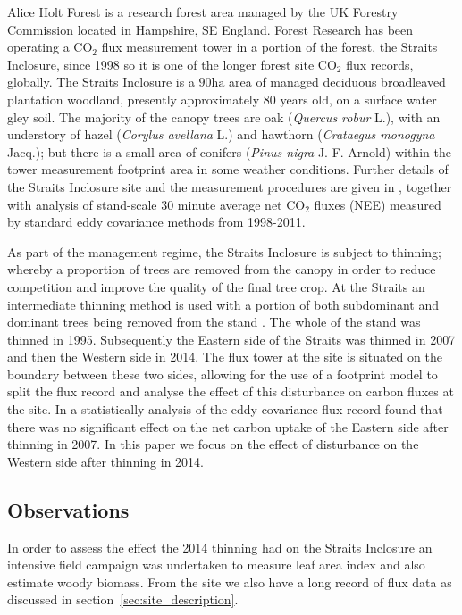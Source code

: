 \documentclass[11pt]{article}
\begin{document}
Alice Holt Forest is a research forest area managed by the UK Forestry Commission located in Hampshire, SE England. Forest Research has been operating a $\text{CO}_{2}$ flux measurement tower in a portion of the forest, the Straits Inclosure, since 1998 so it is one of the longer forest site $\text{CO}_2$ flux records, globally. The Straits Inclosure is a $90 \text{ha}$ area of managed deciduous broadleaved plantation woodland, presently approximately $80$ years old, on a surface water gley soil. The majority of the canopy trees are oak (\textit{Quercus robur} L.), with an understory of hazel (\textit{Corylus avellana} L.) and hawthorn (\textit{Crataegus monogyna} Jacq.); but there is a small area of conifers (\textit{Pinus nigra} J. F. Arnold) within the tower measurement footprint area in some weather conditions. Further details of the Straits Inclosure site and the measurement procedures are given in \citet{wilkinson2012inter}, together with analysis of stand-scale $30$ minute average net $\text{CO}_{2}$ fluxes (NEE) measured by standard eddy covariance methods from 1998-2011. 

As part of the management regime, the Straits Inclosure is subject to thinning; whereby a proportion of trees are removed from the canopy in order to reduce competition and improve the quality of the final tree crop. At the Straits an intermediate thinning method is used with a portion of both subdominant and dominant trees being removed from the stand \citep{kerr2011thinning}. The whole of the stand was thinned in 1995. Subsequently the Eastern side of the Straits was thinned in 2007 and then the Western side in 2014. The flux tower at the site is situated on the boundary between these two sides, allowing for the use of a footprint model to split the flux record and analyse the effect of this disturbance on carbon fluxes at the site. In \citet{wilkinson2015effects} a statistically analysis of the eddy covariance flux record found that there was no significant effect on the net carbon uptake of the Eastern side after thinning in 2007. In this paper we focus on the effect of disturbance on the Western side after thinning in 2014.   

\subsection{Observations} \label{sec:obs}

In order to assess the effect the 2014 thinning had on the Straits Inclosure an intensive field campaign was undertaken to measure leaf area index and also estimate woody biomass. From the site we also have a long record of flux data as discussed in section~\ref{sec:site_description}.
\end{document}
